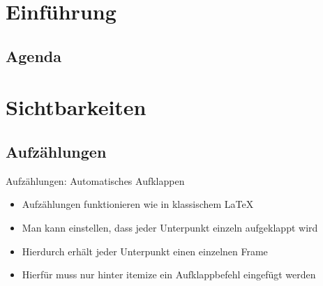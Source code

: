 
\begin{frame}[t,plain]
    \titlepage
\end{frame}

\section{Einführung}
\subsection*{Agenda}
\begin{frame}
    \tableofcontents
\end{frame}


\section{Sichtbarkeiten}
\subsection{Aufzählungen}

\begin{frame}{Aufzählungen: Automatisches Aufklappen}
\begin{itemize}[<+->]
    \item Aufzählungen funktionieren wie in klassischem LaTeX
    \item Man kann einstellen, dass jeder Unterpunkt einzeln aufgeklappt wird
    \item Hierdurch erhält jeder Unterpunkt einen einzelnen Frame
    \item Hierfür muss nur hinter itemize ein Aufklappbefehl eingefügt werden
\end{itemize}

\end{frame}

